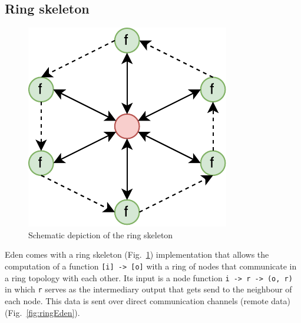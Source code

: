 \documentclass{jfp1}
\newcommand{\inlinecode}[1]{\texttt{#1}}
\begin{document}
\subsection{Ring skeleton} \label{sec:ring}
\begin{figure}[h]
	\includegraphics[scale=0.75]{images/ring}
	\caption{Schematic depiction of the ring skeleton}
	\label{fig:ringImg}
\end{figure}
Eden comes with a ring skeleton (Fig.~\ref{fig:ringImg}) implementation that allows the computation of a function \inlinecode{[i] -> [o]} with a ring of nodes that communicate in a ring topology with each other. Its input is a node function \inlinecode{i -> r -> (o, r)} in which \inlinecode{r} serves as the intermediary output that gets send to the neighbour of each node. This data is sent over direct communication channels (remote data) (Fig.~\ref{fig:ringEden}).
\end{document}
